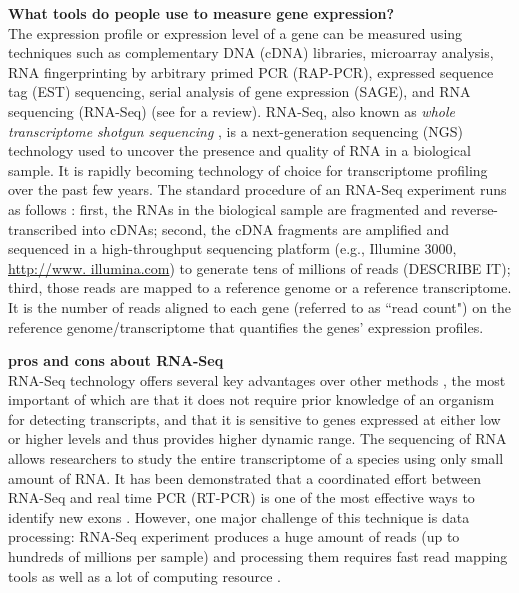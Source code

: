 \textbf{What tools do people use to measure gene expression?}\\
The expression profile or expression level of a gene can be measured using techniques such as
complementary DNA (cDNA) libraries, microarray analysis, RNA fingerprinting by arbitrary primed PCR
(RAP-PCR), expressed sequence tag (EST) sequencing, serial analysis of gene expression (SAGE), and
RNA sequencing (RNA-Seq) (see \cite{casassola2013gene} for a review).
RNA-Seq, also known as \textit{whole transcriptome shotgun sequencing}
\citep{morin2008profiling}, is a next-generation sequencing (NGS) technology used to uncover the
presence and quality of RNA in a biological sample.  It is rapidly becoming technology of choice
for transcriptome profiling over the past few years. 
The standard procedure of an RNA-Seq experiment runs as follows 
\citep{finotello2015measuring}: first, the RNAs in the biological sample are fragmented and
reverse-transcribed into cDNAs; second, the cDNA fragments are amplified and sequenced in a
high-throughput sequencing platform (e.g., Illumine 3000, \url{http://www. illumina.com}) to
generate tens of millions of reads (DESCRIBE IT); third, those reads are mapped to a reference genome
or a reference transcriptome.
It is the number of reads aligned to each gene (referred to as ``read count") on the reference
genome/transcriptome that quantifies the genes' expression profiles.  


\textbf{pros and cons about RNA-Seq}\\
RNA-Seq technology offers several key advantages over other methods \citep{wang2009rna}, the most
important of which are that it does not require prior knowledge of an organism for detecting
transcripts,  and that it is sensitive to genes expressed at either low or higher levels and thus
provides higher dynamic range. The sequencing of RNA allows researchers to study the entire
transcriptome of a species using only small amount of RNA. It has been demonstrated that a
coordinated effort between RNA-Seq and real time PCR (RT-PCR) is one of the most effective ways to
identify new exons \citep{howald2012combining}. However, one major challenge of this technique is
data processing: RNA-Seq experiment produces a huge amount of reads (up to hundreds of
millions per sample) and processing them requires fast read mapping tools as well
as a lot of computing resource
\citep{langmead2009ultrafast,li2010fast}.



